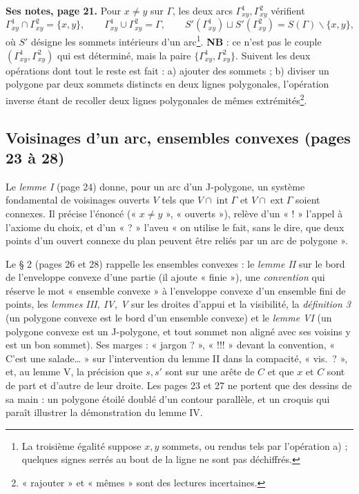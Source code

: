 \documentclass[11pt,a4paper]{article}
\begin{document}
\textbf{Ses notes, page 21.} Pour $x \neq y$ sur $\Gamma$, les deux arcs
$\Gamma^1_{xy}, \Gamma^2_{xy}$ vérifient
\[
\Gamma^1_{xy} \cap \Gamma^2_{xy} = \{x, y\}, \qquad \Gamma^1_{xy} \cup
\Gamma^2_{xy} = \Gamma, \qquad S'(\Gamma^1_{xy}) \sqcup S'(\Gamma^2_{xy}) =
S(\Gamma) \smallsetminus \{x, y\},
\]
où $S'$ désigne les sommets intérieurs d'un arc\footnote{La troisième égalité
suppose $x, y$ sommets, ou rendus tels par l'opération a) ; quelques signes
serrés au bout de la ligne ne sont pas déchiffrés.}. \textbf{NB} : ce n'est pas
le couple $(\Gamma^1_{xy}, \Gamma^2_{xy})$ qui est déterminé, mais la paire
$\{\Gamma^1_{xy}, \Gamma^2_{xy}\}$. Suivent les deux opérations dont tout le
reste est fait : a) ajouter des sommets ; b) diviser un polygone par deux
sommets distincts en deux lignes polygonales, l'opération inverse étant de
recoller deux lignes polygonales de mêmes extrémités\footnote{« rajouter » et
« mêmes » sont des lectures incertaines.}.

\subsection*{Voisinages d'un arc, ensembles convexes (pages 23 à 28)}

Le \emph{lemme I} (page 24) donne, pour un arc d'un J-polygone, un système
fondamental de voisinages ouverts $V$ tels que $V \cap \operatorname{int}\Gamma$
et $V \cap \operatorname{ext}\Gamma$ soient connexes. Il précise l'énoncé
(« $x \neq y$ », « ouverts »), relève d'un « ! » l'appel à l'axiome du choix,
et d'un « ? » l'aveu « on utilise le fait, sans le dire, que deux points d'un
ouvert connexe du plan peuvent être reliés par un arc de polygone ».

Le § 2 (pages 26 et 28) rappelle les ensembles convexes : le \emph{lemme II}
sur le bord de l'enveloppe convexe d'une partie (il ajoute « finie »), une
\emph{convention} qui réserve le mot « ensemble convexe » à l'enveloppe convexe
d'un ensemble fini de points, les \emph{lemmes III, IV, V} sur les droites
d'appui et la visibilité, la \emph{définition 3} (un polygone convexe est le
bord d'un ensemble convexe) et le \emph{lemme VI} (un polygone convexe est un
J-polygone, et tout sommet non aligné avec ses voisins y est un bon sommet). Ses
marges : « jargon ? », « !!! » devant la convention, « C'est une salade… » sur
l'intervention du lemme II dans la compacité, « vis.\ ? », et, au lemme V, la
précision que $s, s'$ sont sur une arête de $C$ et que $x$ et $C$ sont de part
et d'autre de leur droite. Les pages 23 et 27 ne portent que des dessins de sa
main : un polygone étoilé doublé d'un contour parallèle, et un croquis qui
paraît illustrer la démonstration du lemme IV.
\end{document}
